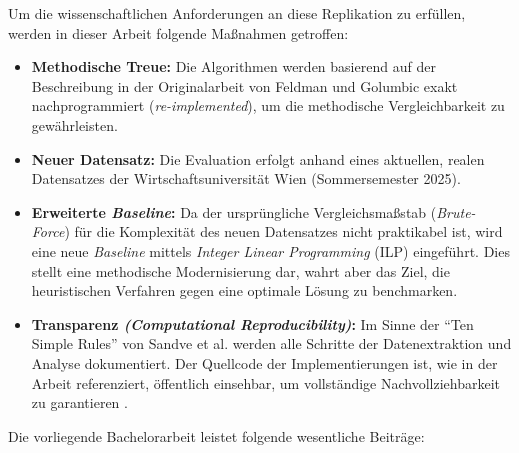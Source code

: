 Um die wissenschaftlichen Anforderungen an diese Replikation zu erfüllen, werden in dieser Arbeit folgende Maßnahmen getroffen:

\begin{itemize}
  \item \textbf{Methodische Treue:} Die Algorithmen werden basierend auf der Beschreibung in der Originalarbeit von Feldman und Golumbic \cite{feldmangolumbic} exakt nachprogrammiert (\textit{re-implemented}), um die methodische Vergleichbarkeit zu gewährleisten.
  \item \textbf{Neuer Datensatz:} Die Evaluation erfolgt anhand eines aktuellen, realen Datensatzes der Wirtschaftsuniversität Wien (Sommersemester 2025).
  \item \textbf{Erweiterte \textit{Baseline}:} Da der ursprüngliche Vergleichsmaßstab (\textit{Brute-Force}) für die Komplexität des neuen Datensatzes nicht praktikabel ist, wird eine neue \textit{Baseline} mittels \textit{Integer Linear Programming} (ILP) eingeführt. Dies stellt eine methodische Modernisierung dar, wahrt aber das Ziel, die heuristischen Verfahren gegen eine optimale Lösung zu benchmarken.
  \item \textbf{Transparenz \textit{(Computational Reproducibility)}:} Im Sinne der \enquote{Ten Simple Rules} von Sandve et al. \cite{sandve-2013} werden alle Schritte der Datenextraktion und Analyse dokumentiert. Der Quellcode der Implementierungen ist, wie in der Arbeit referenziert, öffentlich einsehbar, um vollständige Nachvollziehbarkeit zu garantieren \cite{gh-repo}.
\end{itemize}



Die vorliegende Bachelorarbeit leistet folgende wesentliche Beiträge:

